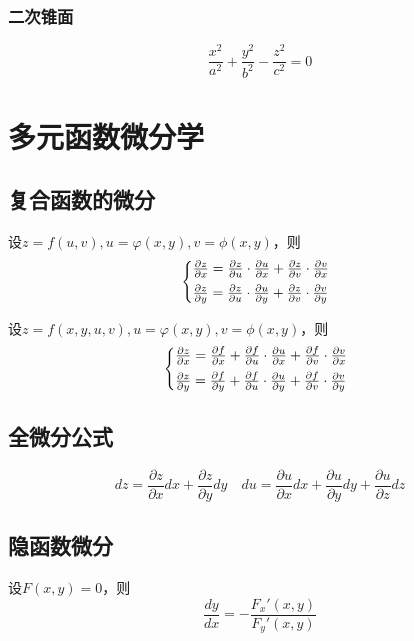 \subsubsection{二次锥面}
\[\frac{x^2}{a^2}+\frac{y^2}{b^2}-\frac{z^2}{c^2}=0\]
\section{多元函数微分学}
\subsection{复合函数的微分}
设$z=f(u,v), u=\varphi(x,y), v=\phi(x,y)$，则
\begin{equation*}
\left\{%
\begin{array}{@{}l}    
    \frac{\partial z}{\partial x}=\frac{\partial z}{\partial u}\cdot\frac{\partial u}{\partial x}+\frac{\partial z}{\partial v}\cdot\frac{\partial v}{\partial x}\\[5pt]
    \frac{\partial z}{\partial y}=\frac{\partial z}{\partial u}\cdot\frac{\partial u}{\partial y}+\frac{\partial z}{\partial v}\cdot\frac{\partial v}{\partial y}\\
\end{array}
\right.
\end{equation*}

设$z=f(x,y,u,v), u=\varphi(x,y), v=\phi(x,y)$，则
\begin{equation*}
\left\{%
\begin{array}{@{}l}    
    \frac{\partial z}{\partial x}=\frac{\partial f}{\partial x}+\frac{\partial f}{\partial u}\cdot\frac{\partial u}{\partial x}+\frac{\partial f}{\partial v}\cdot\frac{\partial v}{\partial x}\\[5pt]
    \frac{\partial z}{\partial y}=\frac{\partial f}{\partial y}+\frac{\partial f}{\partial u}\cdot\frac{\partial u}{\partial y}+\frac{\partial f}{\partial v}\cdot\frac{\partial v}{\partial y}\\
\end{array}
\right.
\end{equation*}
\subsection{全微分公式}
\[dz=\frac{\partial z}{\partial x}dx+\frac{\partial z}{\partial y}dy
\quad du=\frac{\partial u}{\partial x}dx+\frac{\partial u}{\partial y}dy+\frac{\partial u}{\partial z}dz\]
\subsection{隐函数微分}
设$F(x,y)=0$，则
\[\frac{d y}{d x}=-\frac{F_x'(x,y)}{F_y'(x,y)}\]

